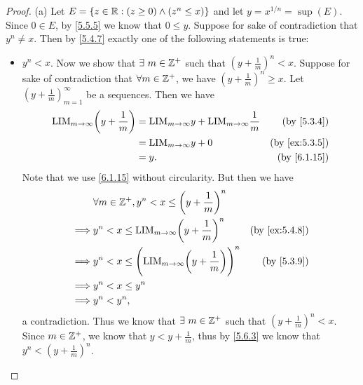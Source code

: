 \begin{proof}{(a)}
  Let \(E = \{z \in \mathbb{R} : (z \geq 0) \land (z^n \leq x)\}\) and let \(y = x^{1 / n} = \sup(E)\).
  Since \(0 \in E\), by \cref{5.5.5} we know that \(0 \leq y\).
  Suppose for sake of contradiction that \(y^n \neq x\).
  Then by \cref{5.4.7} exactly one of the following statements is true:
  \begin{itemize}
    \item \(y^n < x\).
          Now we show that \(\exists\ m \in \mathbb{Z}^+\) such that \((y + \frac{1}{m})^n < x\).
          Suppose for sake of contradiction that \(\forall m \in \mathbb{Z}^+\), we have \((y + \frac{1}{m})^n \geq x\).
          Let \((y + \frac{1}{m})_{m = 1}^\infty\) be a sequences.
          Then we have
          \begin{align*}
            \text{LIM}_{m \to \infty} \bigg(y + \frac{1}{m}\bigg) & = \text{LIM}_{m \to \infty} y + \text{LIM}_{m \to \infty} \frac{1}{m} & \text{(by \cref{5.3.4})}    \\
                                                                  & = \text{LIM}_{m \to \infty} y + 0                                     & \text{(by \cref{ex:5.3.5})} \\
                                                                  & = y.                                                                  & \text{(by \cref{6.1.15})}
          \end{align*}
          Note that we use \cref{6.1.15} without circularity.
          But then we have
          \begin{align*}
                     & \forall m \in \Z^+, y^n < x \leq \bigg(y + \frac{1}{m}\bigg)^n                                                 \\
            \implies & y^n < x \leq \text{LIM}_{m \to \infty} \bigg(y + \frac{1}{m}\bigg)^n             & \text{(by \cref{ex:5.4.8})} \\
            \implies & y^n < x \leq \Bigg(\text{LIM}_{m \to \infty} \bigg(y + \frac{1}{m}\bigg)\Bigg)^n & \text{(by \cref{5.3.9})}    \\
            \implies & y^n < x \leq y^n                                                                                               \\
            \implies & y^n < y^n,
          \end{align*}
          a contradiction.
          Thus we know that \(\exists\ m \in \mathbb{Z}^+\) such that \((y + \frac{1}{m})^n < x\).
          Since \(m \in \mathbb{Z}^+\), we know that \(y < y + \frac{1}{m}\), thus by \cref{5.6.3} we know that \(y^n < (y + \frac{1}{m})^n\).

\end{itemize}
\end{proof}
